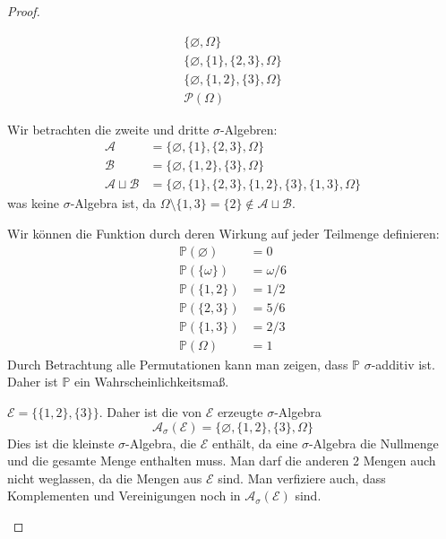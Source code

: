\begin{proof}
	\begin{parts}
		\item \begin{gather*}
			\{\varnothing, \Omega\}\\
			\{\varnothing, \{1\}, \{2,3\}, \Omega\}\\
			\{\varnothing, \{1,2\}, \{3\},\Omega\}\\
			\mathcal{P}(\Omega)
		\end{gather*}
	\item Wir betrachten die zweite und dritte $\sigma$-Algebren:
	\begin{align*}
		\mathcal{A}&=\{\varnothing, \{1\}, \{2,3\}, \Omega\}\\
		\mathcal{B}&=\{\varnothing, \{1,2\}, \{3\},\Omega\}\\
		\mathcal{A}\sqcup \mathcal{B}&=\{\varnothing, \{1\}, \{2,3\}, \{1,2\}, \{3\}, \{1,3\}, \Omega \}
	\end{align*}
was keine $\sigma$-Algebra ist, da $\Omega \setminus \{1,3\}=\{2\}\not\in \mathcal{A}\sqcup \mathcal{B}$.
\item Wir können die Funktion durch deren Wirkung auf jeder Teilmenge definieren:
\begin{align*}
	\mathbb{P}(\varnothing)&=0\\
	\mathbb{P}(\{\omega\})&=\omega/6\\
	\mathbb{P}(\{1,2\})&=1/2\\
	\mathbb{P}(\{2,3\})&=5/6\\
	\mathbb{P}(\{1,3\})&=2/3\\
	\mathbb{P}(\Omega)&=1
\end{align*}
Durch Betrachtung alle Permutationen kann man zeigen, dass $\mathbb{P}$ $\sigma$-additiv ist. Daher ist $\mathbb{P}$ ein Wahrscheinlichkeitsmaß.
\item $\mathcal{E}=\{\{1,2\},\{3\}\}$. Daher ist die von $\mathcal{E}$ erzeugte $\sigma$-Algebra
\[\mathcal{A}_\sigma(\mathcal{E})=\{\varnothing, \{1,2\}, \{3\}, \Omega\}\]
Dies ist die kleinste $\sigma$-Algebra, die $\mathcal{E}$ enthält, da eine $\sigma$-Algebra die Nullmenge und die gesamte Menge enthalten muss. Man darf die anderen 2 Mengen auch nicht weglassen, da die Mengen aus $\mathcal{E}$ sind. Man verfiziere auch, dass Komplementen und Vereinigungen noch in $\mathcal{A}_\sigma(\mathcal{E})$ sind.\qedhere
	\end{parts}
\end{proof}